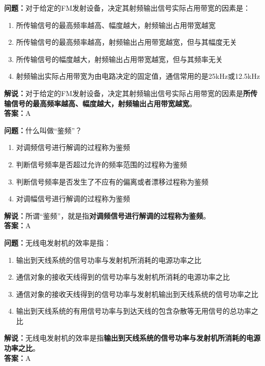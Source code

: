 \textbf{问题：}对于给定的FM发射设备，决定其射频输出信号实际占用带宽的因素是：

\begin{enumerate}[label=\Alph*), leftmargin=1cm]
	\item 所传输信号的最高频率越高、幅度越大，射频输出占用带宽越宽
	\item 所传输信号的最高频率越高，射频输出占用带宽越宽，但与其幅度无关
	\item 所传输信号的幅度越大，射频输出占用带宽越宽，但与其频率无关
	\item 射频输出实际占用带宽为由电路决定的固定值，通信常用的是25kHz或12.5kHz
\end{enumerate}

\textbf{解说：}对于给定的FM发射设备，决定其射频输出信号实际占用带宽的因素是\textbf{所传输信号的最高频率越高、幅度越大，射频输出占用带宽越宽}。\\\textbf{答案：}A%



\textbf{问题：}什么叫做“鉴频”？

\begin{enumerate}[label=\Alph*), leftmargin=1cm]
	\item 对调频信号进行解调的过程称为鉴频
	\item 判断信号频率是否超过允许的频率范围的过程称为鉴频
	\item 判断信号频率是否发生了不应有的偏离或者漂移过程称为鉴频
	\item 对调幅信号进行解调的过程称为鉴频
\end{enumerate}

\textbf{解说：}所谓“鉴频”，就是指\textbf{对调频信号进行解调的过程称为鉴频}。\\\textbf{答案：}A%



\textbf{问题：}无线电发射机的效率是指：

\begin{enumerate}[label=\Alph*), leftmargin=1cm]
	\item 输出到天线系统的信号功率与发射机所消耗的电源功率之比
	\item 通信对象的接收天线得到的信号功率与发射机所消耗的电源功率之比
	\item 通信对象的接收天线得到的信号功率与发射机输出到天线系统的信号功率之比
	\item 输出到天线系统的有用信号功率与到达天线的包含杂散等无用信号的总功率之比
\end{enumerate}

\textbf{解说：}无线电发射机的效率是指\textbf{输出到天线系统的信号功率与发射机所消耗的电源功率之比}。\\\textbf{答案：}A%



